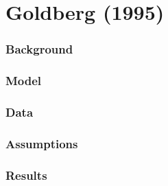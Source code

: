 \section{Goldberg (1995)}

\subsubsection{Background}



\subsubsection{Model}



\subsubsection{Data}



\subsubsection{Assumptions}



\subsubsection{Results}

